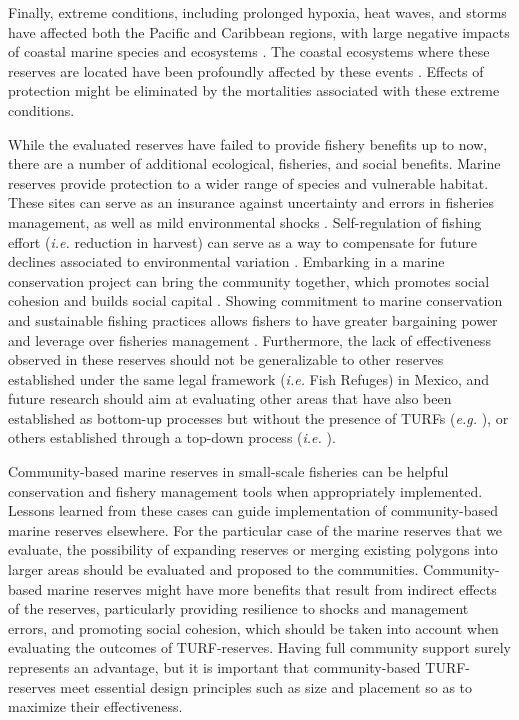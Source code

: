 \documentclass{frontiersSCNS}
\begin{document}
Finally, extreme conditions, including prolonged hypoxia, heat waves,
and storms have affected both the Pacific and Caribbean regions, with
large negative impacts of coastal marine species and ecosystems
\citep{cavole_2016,hughes_2018,breitburg_2018}. The coastal ecosystems
where these reserves are located have been profoundly affected by these
events \citep{micheli_2012-EU,woodson}. Effects of protection might be
eliminated by the mortalities associated with these extreme conditions.

While the evaluated reserves have failed to provide fishery benefits up
to now, there are a number of additional ecological, fisheries, and
social benefits. Marine reserves provide protection to a wider range of
species and vulnerable habitat. These sites can serve as an insurance
against uncertainty and errors in fisheries management, as well as mild
environmental shocks
\citep{micheli_2012-EU,deleo_2015,roberts_2017-J9,aalto}.
Self-regulation of fishing effort (\emph{i.e.} reduction in harvest) can
serve as a way to compensate for future declines associated to
environmental variation \citep{finkbeiner_2018}. Embarking in a marine
conservation project can bring the community together, which promotes
social cohesion and builds social capital \citep{fulton_2019}. Showing
commitment to marine conservation and sustainable fishing practices
allows fishers to have greater bargaining power and leverage over
fisheries management \citep{prezramrez_2012}. Furthermore, the lack of
effectiveness observed in these reserves should not be generalizable to
other reserves established under the same legal framework (\emph{i.e.}
Fish Refuges) in Mexico, and future research should aim at evaluating
other areas that have also been established as bottom-up processes but
without the presence of TURFs (\emph{e.g.} \citet{dof_websiteC_2012}),
or others established through a top-down process (\emph{i.e.}
\citet{dof_websiteU_2018}).

Community-based marine reserves in small-scale fisheries can be helpful
conservation and fishery management tools when appropriately
implemented. Lessons learned from these cases can guide implementation
of community-based marine reserves elsewhere. For the particular case of
the marine reserves that we evaluate, the possibility of expanding
reserves or merging existing polygons into larger areas should be
evaluated and proposed to the communities. Community-based marine
reserves might have more benefits that result from indirect effects of
the reserves, particularly providing resilience to shocks and management
errors, and promoting social cohesion, which should be taken into
account when evaluating the outcomes of TURF-reserves. Having full
community support surely represents an advantage, but it is important
that community-based TURF-reserves meet essential design principles such
as size and placement so as to maximize their effectiveness.
\end{document}
